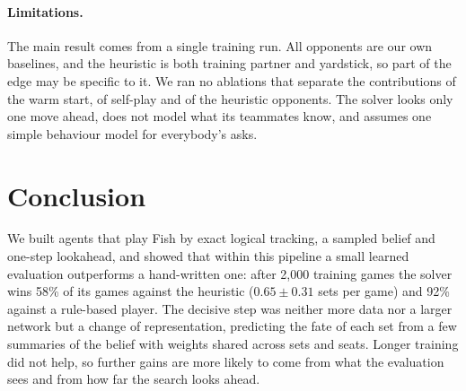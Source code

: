 \documentclass{article}
\begin{document}
\paragraph{Limitations.}
The main result comes from a single training run.  All opponents are our own
baselines, and the heuristic is both training partner and yardstick, so part of
the edge may be specific to it.  We ran no ablations that separate the
contributions of the warm start, of self-play and of the heuristic opponents.
The solver looks only one move ahead, does not model what its teammates know,
and assumes one simple behaviour model for everybody's asks.

\section{Conclusion}

We built agents that play Fish by exact logical tracking, a sampled belief and
one-step lookahead, and showed that within this pipeline a small learned
evaluation outperforms a hand-written one: after 2,000 training games the
solver wins 58\% of its games against the heuristic ($0.65 \pm 0.31$ sets per
game) and 92\% against a rule-based player.  The decisive step was neither more
data nor a larger network but a change of representation, predicting the fate
of each set from a few summaries of the belief with weights shared across sets
and seats.  Longer training did not help, so further gains are more likely to
come from what the evaluation sees and from how far the search looks ahead.


{\small
\setlength{\bibsep}{4pt plus 1pt}


}
\end{document}
